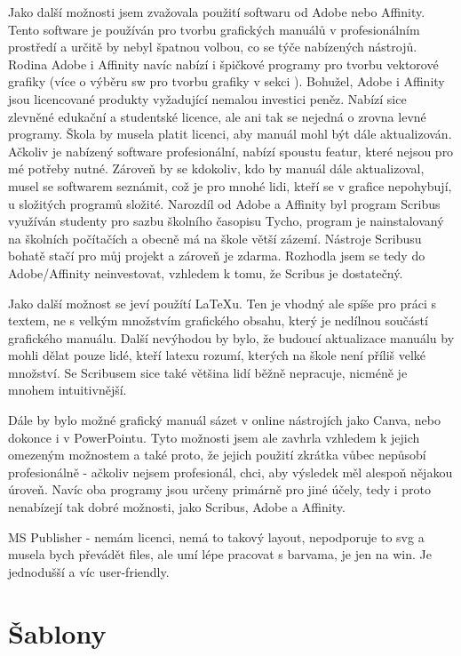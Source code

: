\documentclass[11pt,a4paper,twoside,openright]{report}
\begin{document}
Jako další možnosti jsem zvažovala použití softwaru od Adobe nebo Affinity. Tento software je používán pro tvorbu grafických manuálů v profesionálním prostředí a určitě by nebyl špatnou volbou, co se týče nabízených nástrojů. Rodina Adobe i Affinity navíc nabízí i špičkové programy pro tvorbu vektorové grafiky (více o výběru sw pro tvorbu grafiky v sekci ). Bohužel, Adobe i Affinity jsou licencované produkty vyžadující nemalou investici peněz. Nabízí sice zlevněné edukační a studentské licence, ale ani tak se nejedná o zrovna levné programy. Škola by musela platit licenci, aby manuál mohl být dále aktualizován. Ačkoliv je nabízený software profesionální, nabízí spoustu featur, které nejsou pro mé potřeby nutné. Zároveň by se kdokoliv, kdo by manuál dále aktualizoval, musel se softwarem seznámit, což je pro mnohé lidi, kteří se v grafice nepohybují, u složitých programů složité. Narozdíl od Adobe a Affinity byl program Scribus využíván studenty pro sazbu školního časopisu Tycho, program je nainstalovaný na školních počítačích a obecně má na škole větší zázemí. Nástroje Scribusu bohatě stačí pro můj projekt a zároveň je zdarma. Rozhodla jsem se tedy do Adobe/Affinity neinvestovat, vzhledem k tomu, že Scribus je dostatečný.

Jako další možnost se jeví použítí LaTeXu. Ten je vhodný ale spíše pro práci s textem, ne s velkým množstvím grafického obsahu, který je nedílnou součástí grafického manuálu. Další nevýhodou by bylo, že budoucí aktualizace manuálu by mohli dělat pouze lidé, kteří latexu rozumí, kterých na škole není příliš velké množství. Se Scribusem sice také většina lidí běžně nepracuje, nicméně je mnohem intuitivnější.

Dále by bylo možné grafický manuál sázet v online nástrojích jako Canva, nebo dokonce i v PowerPointu. Tyto možnosti jsem ale zavhrla vzhledem k jejich omezeným možnostem a také proto, že jejich použití zkrátka vůbec nepůsobí profesionálně - ačkoliv nejsem profesionál, chci, aby výsledek měl alespoň nějakou úroveň. Navíc oba programy jsou určeny primárně pro jiné účely, tedy i proto nenabízejí tak dobré možnosti, jako Scribus, Adobe a Affinity.

MS Publisher - nemám licenci, nemá to takový layout, nepodporuje to svg a musela bych převádět files, ale umí lépe pracovat s barvama, je jen na win. Je jednodušší a víc user-friendly. 

\section{Šablony}
\end{document}

